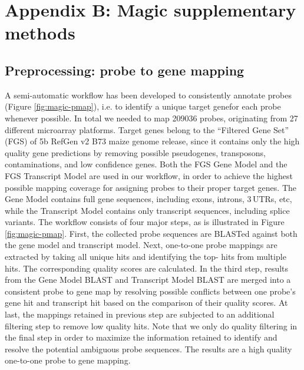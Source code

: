 \chapter{Appendix B: Magic supplementary methods}\label{ch:apd-magic}


\instructionsappendices


\section{Preprocessing: probe to gene mapping}\label{apd:magic-probemap}

%
%

A semi-automatic workflow has been developed to consistently
annotate probes (Figure \ref{fig:magic-pmap}), i.e. to identify a unique target 
genefor each probe whenever possible. In total we needed to map
209036 probes, originating from 27 different microarray
platforms. Target genes belong to the “Filtered Gene Set” (FGS)
of 5b RefGen v2 B73 maize genome release, since it contains only
the high quality gene predictions by removing possible
pseudogenes, transposons, contaminations, and low confidence
genes. Both the FGS Gene Model and the FGS Transcript Model are
used in our workflow, in order to achieve the highest possible
mapping coverage for assigning probes to their proper target
genes. The Gene Model contains full gene sequences, including
exons, introns, 3\textquotesingle\,UTRs, etc, while the Transcript Model 
contains
only transcript sequences, including splice variants. The
workflow consists of four major steps, as is illustrated in
Figure \ref{fig:magic-pmap}. First, the collected probe sequences are BLASTed
against both the gene model and transcript model. Next,
one-to-one probe mappings are extracted by taking all unique hits
and identifying the top- hits from multiple hits. The
corresponding quality scores are calculated. In the third step,
results from the Gene Model BLAST and Transcript Model BLAST are
merged into a consistent probe to gene map by resolving possible
conflicts between one probe’s gene hit and transcript hit based
on the comparison of their quality scores. At last, the mappings
retained in previous step are subjected to an additional
filtering step to remove low quality hits. Note that we only do
quality filtering in the final step in order to maximize the
information retained to identify and resolve the potential
ambiguous probe sequences. The results are a high quality
one-to-one probe to gene mapping.


